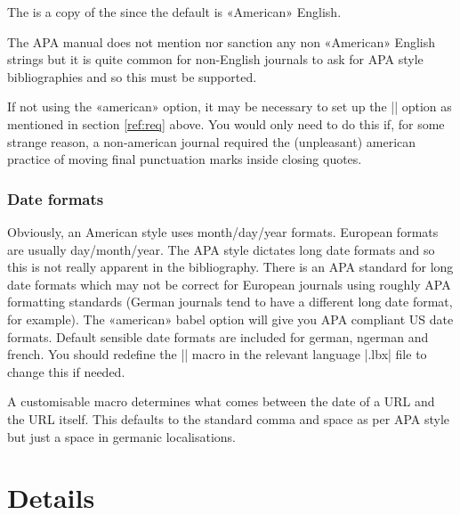 \documentclass{ltxdockit}
\begin{document}
The  is a copy of the  since
the default is «American» English.

The APA manual does not mention nor sanction any non «American» English
strings but it is quite common for non-English journals to ask for APA style
bibliographies and so this must be supported.

If not using the  «american» option, it may be necessary to set up
the |\DeclareQuotePunctuation| option as mentioned in section \ref{ref:req}
above. You would only need to do this if, for some strange reason, a
non-american journal required the (unpleasant) american practice of moving
final punctuation marks inside closing quotes.

\subsubsection{Date formats}

Obviously, an American style uses month/day/year formats. European formats
are usually day/month/year. The APA style dictates long date formats and so
this is not really apparent in the bibliography. There is an APA standard
for long date formats which may not be correct for European journals using
roughly APA formatting standards (German journals tend to have a different
long date format, for example). The «american» babel option will give you
APA compliant US date formats. Default sensible date formats are included
for german, ngerman and french. You should redefine the |\mkbibdatelong|
macro in the relevant language |.lbx| file to change this if needed.

A customisable macro  determines what comes between the
date of a URL and the URL itself. This defaults to the standard comma and
space as per APA style but just a space in germanic localisations.

\section{Details}
\end{document}
